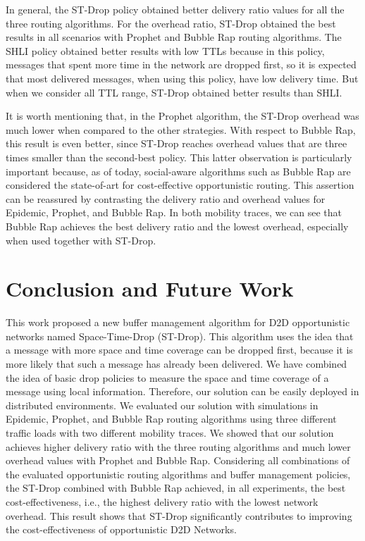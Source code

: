 In general, the ST-Drop policy obtained better delivery ratio values for all the three routing algorithms. For the overhead ratio, ST-Drop obtained the best results in all scenarios with Prophet and Bubble Rap routing algorithms. The SHLI policy obtained better results with low TTLs because in this policy, messages that spent more time in the network are dropped first, so it is expected that most delivered messages, when using this policy, have low delivery time. But when we consider all TTL range, ST-Drop obtained better results than SHLI.

It is worth mentioning that, in the Prophet algorithm, the ST-Drop overhead was much lower when compared to the other strategies. With respect to Bubble Rap, this result is even better, since ST-Drop reaches overhead values that are three times smaller than the second-best policy. This latter observation is particularly important because, as of today, social-aware algorithms such as Bubble Rap are considered the state-of-art for cost-effective opportunistic routing. This assertion can be reassured by contrasting the delivery ratio and overhead values for Epidemic, Prophet, and Bubble Rap. In both mobility traces, we can see that Bubble Rap achieves the best delivery ratio and the lowest overhead, especially when used together with ST-Drop.

\section{Conclusion and Future Work}
\label{sec:conclusion}

This work proposed a new buffer management algorithm for D2D opportunistic networks named Space-Time-Drop (ST-Drop). This algorithm uses the idea that a message with more space and time coverage can be dropped first, because it is more likely that such a message has already been delivered. We have combined the idea of basic drop policies to measure the space and time coverage of a message using local information. Therefore, our solution can be easily deployed in distributed environments. We evaluated our solution with simulations in Epidemic, Prophet, and Bubble Rap routing algorithms using three different traffic loads with two different mobility traces. We showed that our solution achieves higher delivery ratio with the three routing algorithms and much lower overhead values with Prophet and Bubble Rap. Considering all combinations of the evaluated opportunistic routing algorithms and buffer management policies, the ST-Drop combined with Bubble Rap achieved, in all experiments, the best cost-effectiveness, i.e.,
the highest delivery ratio with the lowest network overhead. This result shows that ST-Drop significantly contributes to improving the cost-effectiveness of opportunistic D2D Networks.

